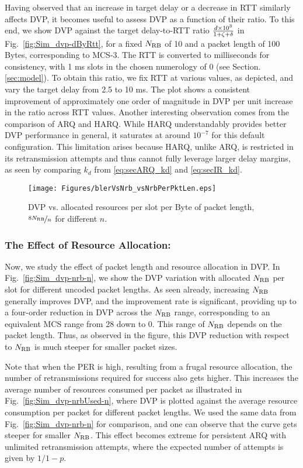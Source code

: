 Having observed that an increase in target delay or a decrease in RTT similarly affects DVP, it becomes useful to assess DVP as a function of their ratio.
To this end, we show DVP against the target delay-to-RTT ratio $\frac{d\times10^3}{1+{\zeta}+\delta}$ in Fig.~\ref{fig:Sim_dvp-dByRtt}, for a fixed $N_{\mathrm{RB}}$ of 10 and a packet length of 100 Bytes, corresponding to MCS-3. 
The RTT is converted to milliseconds for consistency, with 1 ms slots in the chosen numerology of 0 (see Section.\ref{sec:model}).
To obtain this ratio, we fix RTT at various values, as depicted, and vary the target delay from 2.5 to 10 ms.
The plot shows a consistent improvement of approximately one order of magnitude in DVP per unit increase in the ratio across RTT values. 
Another interesting observation comes from the comparison of ARQ and HARQ. While HARQ understandably provides better DVP performance in general, it saturates at around $10^{-7}$ for this default configuration. 
This limitation arises because HARQ, unlike ARQ, is restricted in its retransmission attempts and thus cannot fully leverage larger delay margins, as seen by comparing $k_d$ from \eqref{eq:secARQ_kd} and \eqref{eq:secIR_kd}.
\begin{figure}[t]
\centering
\texttt{[image: Figures/blerVsNrb\_vsNrbPerPktLen.eps]}
\caption{DVP vs. allocated resources per slot per Byte of packet length, $\nicefrac{8N_{\mathrm{RB}}}{n}$ for different $n$.}
\label{fig:Sim_dvp-nrb-nrbByn}
\end{figure}

\subsubsection*{The Effect of Resource Allocation:}
Now, we study the effect of packet length and resource allocation in DVP. In Fig.~\ref{fig:Sim_dvp-nrb-n}, we show the DVP variation with allocated $N_{\mathrm{RB}}$ per slot for different uncoded packet lengths. 
As seen already, increasing $N_{\mathrm{RB}}$ generally improves DVP, and the improvement rate is significant, providing up to a four-order reduction in DVP across the $N_{\mathrm{RB}}$ range, corresponding to an equivalent MCS range from 28 down to 0. This range of $N_{\mathrm{RB}}$ depends on the packet length. Thus, as observed in the figure, this DVP reduction with respect to $N_{\mathrm{RB}}$ is much steeper for smaller packet sizes.


Note that when the PER is high, resulting from a frugal resource allocation, the number of retransmissions required for success also gets higher.
This increases the average number of resources consumed per packet as illustrated in Fig.~\ref{fig:Sim_dvp-nrbUsed-n}, where DVP is plotted against the average resource consumption per packet for different packet lengths.
We used the same data from Fig.~\ref{fig:Sim_dvp-nrb-n} for comparison, and one can observe that the curve gets steeper for smaller $N_{\mathrm{RB}}$. 
This effect becomes extreme for persistent ARQ with unlimited retransmission attempts, where the expected number of attempts is given by ${1}/{1-p}$.


